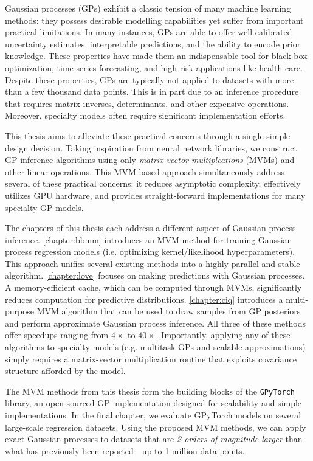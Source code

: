 Gaussian processes (GPs) exhibit a classic tension of many machine learning methods:
they possess desirable modelling capabilities yet suffer from important practical limitations.
In many instances, GPs are able to offer well-calibrated uncertainty estimates, interpretable predictions, and the ability to encode prior knowledge.
These properties have made them an indispensable tool for black-box optimization, time series forecasting, and high-risk applications like health care.
Despite these properties, GPs are typically not applied to datasets with more than a few thousand data points.
This is in part due to an inference procedure that requires matrix inverses, determinants, and other expensive operations.
Moreover, specialty models often require significant implementation efforts.

This thesis aims to alleviate these practical concerns through a single simple design decision.
Taking inspiration from neural network libraries, we construct GP inference algorithms using only \emph{matrix-vector multiplcations} (MVMs) and other linear operations.
This MVM-based approach simultaneously address several of these practical concerns: it reduces asymptotic complexity, effectively utilizes GPU hardware, and provides straight-forward implementations for many specialty GP models.

The chapters of this thesis each address a different aspect of Gaussian process inference.
\cref{chapter:bbmm} introduces an MVM method for training Gaussian process regression models (i.e. optimizing kernel/likelihood hyperparameters).
This approach unifies several existing methods into a highly-parallel and stable algorithm.
\cref{chapter:love} focuses on making predictions with Gaussian processes.
A memory-efficient cache, which can be computed through MVMs, significantly reduces computation for predictive distributions.
\cref{chapter:ciq} introduces a multi-purpose MVM algorithm that can be used to draw samples from GP posteriors and perform approximate Gaussian process inference.
All three of these methods offer speedups ranging from $4\times$ to $40\times$.
Importantly, applying any of these algorithms to specialty models (e.g. multitask GPs and scalable approximations) simply requires a matrix-vector multiplication routine that exploits covariance structure afforded by the model.

The MVM methods from this thesis form the building blocks of the {\tt GPyTorch} library, an open-sourced GP implementation designed for scalability and simple implementations.
In the final chapter, we evaluate GPyTorch models on several large-scale regression datasets.
Using the proposed MVM methods, we can apply exact Gaussian processes to datasets that are \emph{2 orders of magnitude larger} than what has previously been reported---up to 1 million data points.
